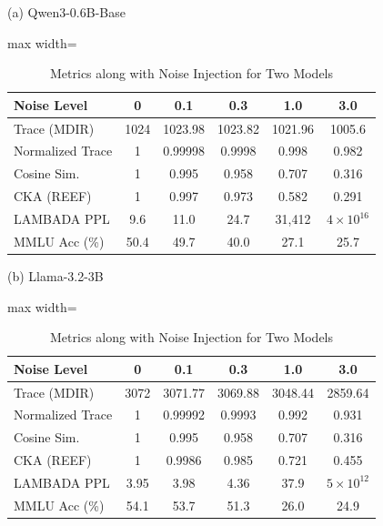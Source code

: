 \documentclass{article} %
\begin{document}
\begin{table}[h]
\centering
\caption{Metrics along with Noise Injection for Two Models}
\label{tab:noising}
\begin{subtable}
\centering
\small
(a) Qwen3-0.6B-Base
\begin{adjustbox}{max width=\linewidth}
\begin{tabular}{lccccc}
\toprule
Noise Level & 0 & 0.1 & 0.3 & 1.0 & 3.0 \\
\midrule
Trace (MDIR) & 1024 & 1023.98 & 1023.82 & 1021.96 & 1005.6 \\
Normalized Trace & 1 & 0.99998 & 0.9998 & 0.998 & 0.982 \\
Cosine Sim. & 1 & 0.995 & 0.958 & 0.707 & 0.316 \\
CKA (REEF) & 1 & 0.997 & 0.973 & 0.582 & 0.291 \\
LAMBADA PPL & 9.6 & 11.0 & 24.7 & 31{,}412 & $4\times10^{16}$ \\
MMLU Acc (\%) & 50.4 & 49.7 & 40.0 & 27.1 & 25.7 \\
\bottomrule
\end{tabular}
\end{adjustbox}
\label{subtab:qwen}
\end{subtable}

\vspace{1.2em}

\begin{subtable}
\centering
\small
(b) Llama-3.2-3B
\begin{adjustbox}{max width=\linewidth}
\begin{tabular}{lccccc}
\toprule
Noise Level & 0 & 0.1 & 0.3 & 1.0 & 3.0 \\
\midrule
Trace (MDIR) & 3072 & 3071.77 & 3069.88 & 3048.44 & 2859.64 \\
Normalized Trace & 1 & 0.99992 & 0.9993 & 0.992 & 0.931 \\
Cosine Sim. & 1 & 0.995 & 0.958 & 0.707 & 0.316 \\
CKA (REEF) & 1 & 0.9986 & 0.985 & 0.721 & 0.455 \\
LAMBADA PPL & 3.95 & 3.98 & 4.36 & 37.9 & $5\times10^{12}$ \\
MMLU Acc (\%) & 54.1 & 53.7 & 51.3 & 26.0 & 24.9 \\
\bottomrule
\end{tabular}
\end{adjustbox}
\label{subtab:llama}
\end{subtable}
\end{table}
\end{document}
